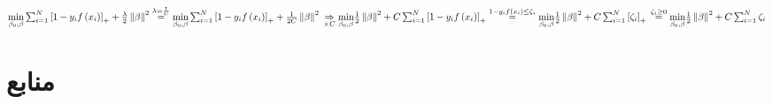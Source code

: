 \documentclass{article}
\begin{document}
\section{}
\begin{latin}
$
\underset{\beta_0, \beta}{\min} \sum_{i = 1}^{N}\left[ 1-y_if\left( x_i \right) \right]_+ + \frac{\lambda}{2}\left\| \beta \right\| ^ 2 \overset{\lambda = \frac{1}{C}}{=}
\underset{\beta_0, \beta}{\min} \sum_{i = 1}^{N}\left[ 1-y_if\left( x_i \right) \right]_+ + \frac{1}{2C}\left\| \beta \right\| ^ 2 \\ 
\underset{\times C}{\Rightarrow}
\underset{\beta_0, \beta}{\min} \frac{1}{2}\left\| \beta \right\| ^ 2 +  C \sum_{i = 1}^{N}\left[ 1-y_if\left( x_i \right) \right]_+ \overset{1-y_if\left( x_i \right) \le \zeta_i}{=}
\underset{\beta_0, \beta}{\min} \frac{1}{2}\left\| \beta \right\| ^ 2 +  C \sum_{i = 1}^{N}\left[ \zeta_i \right]_+ \\ \overset{\zeta_i \ge 0}{=}
\underset{\beta_0, \beta}{\min} \frac{1}{2}\left\| \beta \right\| ^ 2 +  C \sum_{i = 1}^{N} \zeta_i 
$
\end{latin}









\section*{منابع}
\renewcommand{\section}[2]{}%
\begin{thebibliography}{99} %


\begin{LTRitems}

\resetlatinfont

\end{LTRitems}

\end{thebibliography}
\end{document}
